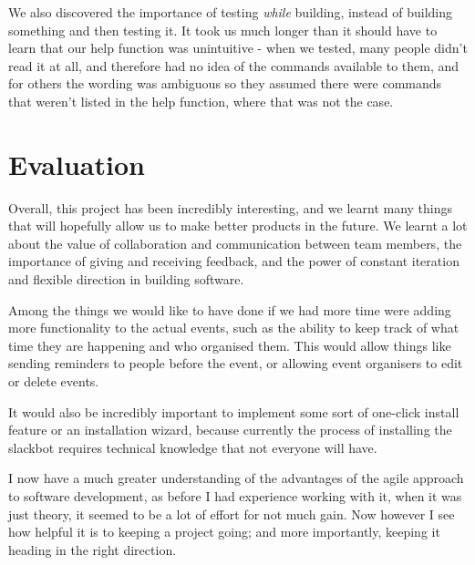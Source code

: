 \documentclass[12pt]{report}
\begin{document}
We also discovered the importance of testing \emph{while} building, instead of building something and then testing it. It took us much longer than it should have to learn that our help function was unintuitive - when we tested, many people didn't read it at all, and therefore had no idea of the commands available to them, and for others the wording was ambiguous so they assumed there were commands that weren't listed in the help function, where that was not the case.

\section{Evaluation}
Overall, this project has been incredibly interesting, and we learnt many things that will hopefully allow us to make better products in the future. We learnt a lot about the value of collaboration and communication between team members, the importance of giving and receiving feedback, and the power of constant iteration and flexible direction in building software.

Among the things we would like to have done if we had more time were adding more functionality to the actual events, such as the ability to keep track of what time they are happening and who organised them. This would allow things like sending reminders to people before the event, or allowing event organisers to edit or delete events.

It would also be incredibly important to implement some sort of one-click install feature or an installation wizard, because currently the process of installing the slackbot requires technical knowledge that not everyone will have.

I now have a much greater understanding of the advantages of the agile approach to software development, as before I had experience working with it, when it was just theory, it seemed to be a lot of effort for not much gain. Now however I see how helpful it is to keeping a project going; and more importantly, keeping it heading in the right direction.
\end{document}

